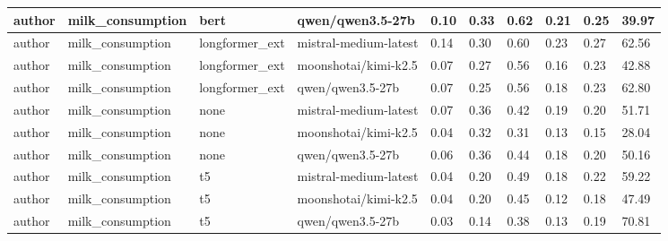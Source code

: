 \begin{tabular}{|l|l|l|l|l|l|l|l|l|l|}
 \hline
 author & milk\_consumption & bert & qwen/qwen3.5-27b & 0.10 & 0.33 & 0.62 & 0.21 & 0.25 & 39.97 \\
 \hline
 author & milk\_consumption & longformer\_ext & mistral-medium-latest & 0.14 & 0.30 & 0.60 & 0.23 & 0.27 & 62.56 \\
 \hline
 author & milk\_consumption & longformer\_ext & moonshotai/kimi-k2.5 & 0.07 & 0.27 & 0.56 & 0.16 & 0.23 & 42.88 \\
 \hline
 author & milk\_consumption & longformer\_ext & qwen/qwen3.5-27b & 0.07 & 0.25 & 0.56 & 0.18 & 0.23 & 62.80 \\
 \hline
 author & milk\_consumption & none & mistral-medium-latest & 0.07 & 0.36 & 0.42 & 0.19 & 0.20 & 51.71 \\
 \hline
 author & milk\_consumption & none & moonshotai/kimi-k2.5 & 0.04 & 0.32 & 0.31 & 0.13 & 0.15 & 28.04 \\
 \hline
 author & milk\_consumption & none & qwen/qwen3.5-27b & 0.06 & 0.36 & 0.44 & 0.18 & 0.20 & 50.16 \\
 \hline
 author & milk\_consumption & t5 & mistral-medium-latest & 0.04 & 0.20 & 0.49 & 0.18 & 0.22 & 59.22 \\
 \hline
 author & milk\_consumption & t5 & moonshotai/kimi-k2.5 & 0.04 & 0.20 & 0.45 & 0.12 & 0.18 & 47.49 \\
 \hline
 author & milk\_consumption & t5 & qwen/qwen3.5-27b & 0.03 & 0.14 & 0.38 & 0.13 & 0.19 & 70.81 \\
\hline
\end{tabular}
